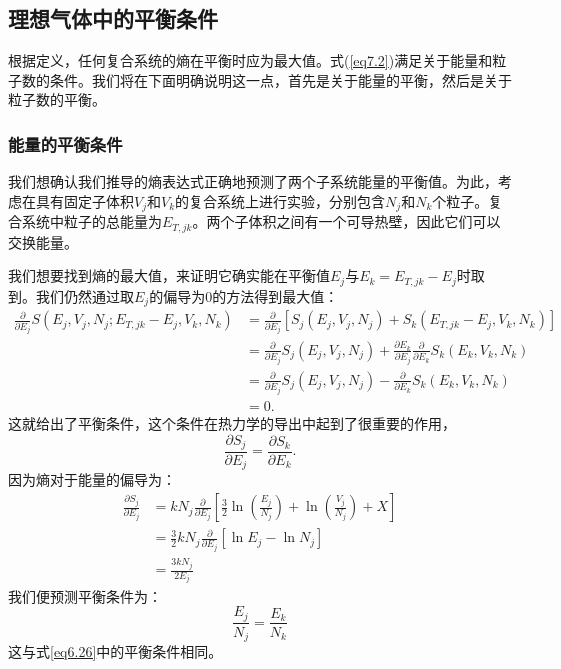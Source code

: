 \documentclass[UTF8]{ctexart}
\numberwithin{equation}{section}%
\numberwithin{figure}{section}%
\begin{document}
    \subsection{理想气体中的平衡条件}
    根据定义，任何复合系统的熵在平衡时应为最大值。式(\ref{eq7.2})满足关于能量和粒子数的条件。我们将在下面明确说明这一点，首先是关于能量的平衡，然后是关于粒子数的平衡。
    \subsubsection{能量的平衡条件}
    我们想确认我们推导的熵表达式正确地预测了两个子系统能量的平衡值。为此，考虑在具有固定子体积$V_j$和$V_k$的复合系统上进行实验，分别包含$N_j$和$N_k$个粒子。复合系统中粒子的总能量为$E_{T,jk}$。两个子体积之间有一个可导热壁，因此它们可以交换能量。

    我们想要找到熵的最大值，来证明它确实能在平衡值$E_j$与$E_k=E_{T,jk}-E_j$时取到。我们仍然通过取$E_j$的偏导为0的方法得到最大值：
    \begin{equation}
        \begin{aligned}
            \frac{\partial}{\partial E_{j}} S\left(E_{j}, V_{j}, N_{j} ; E_{T, j k}-E_{j}, V_{k}, N_{k}\right) &=\frac{\partial}{\partial E_{j}}\left[S_{j}\left(E_{j}, V_{j}, N_{j}\right)+S_{k}\left(E_{T, j k}-E_{j}, V_{k}, N_{k}\right)\right] \\
            &=\frac{\partial}{\partial E_{j}} S_{j}\left(E_{j}, V_{j}, N_{j}\right)+\frac{\partial E_{k}}{\partial E_{j}} \frac{\partial}{\partial E_{k}} S_{k}\left(E_{k}, V_{k}, N_{k}\right) \\
            &=\frac{\partial}{\partial E_{j}} S_{j}\left(E_{j}, V_{j}, N_{j}\right)-\frac{\partial}{\partial E_{k}} S_{k}\left(E_{k}, V_{k}, N_{k}\right) \\
            &=0 .
            \end{aligned}
    \end{equation}
    这就给出了平衡条件，这个条件在热力学的导出中起到了很重要的作用，
    \begin{equation}
        \frac{\partial S_{j}}{\partial E_{j}}=\frac{\partial S_{k}}{\partial E_{k}} .
    \end{equation}
    因为熵对于能量的偏导为：
    \begin{equation}
        \begin{aligned}
            \frac{\partial S_{j}}{\partial E_{j}} &=k N_{j} \frac{\partial}{\partial E_{j}}\left[\frac{3}{2} \ln \left(\frac{E_{j}}{N_{j}}\right)+\ln \left(\frac{V_{j}}{N_{j}}\right)+X\right] \\
            &=\frac{3}{2} k N_{j} \frac{\partial}{\partial E_{j}}\left[\ln E_{j}-\ln N_{j}\right] \\
            &=\frac{3 k N_{j}}{2 E_{j}}
            \end{aligned}
    \end{equation}
    我们便预测平衡条件为：
    \begin{equation}
        \frac{E_{j}}{N_{j}}=\frac{E_{k}}{N_{k}}
    \end{equation}
    这与式\ref{eq6.26}中的平衡条件相同。
\end{document}
